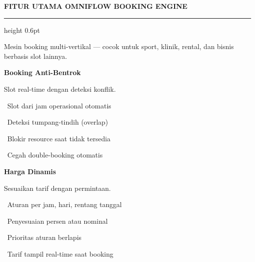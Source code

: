 \documentclass[a4paper]{article}
\newcommand{\sectiontitle}[1]{%
    \vspace{10pt}%
    {\fontsize{13}{16}\selectfont\bfseries\color{BlueDark} #1}\par\vspace{3pt}%
    {\color{BluePrimary}\hrule height 0.6pt}\par\vspace{8pt}%
}
\begin{document}
\sectiontitle{FITUR UTAMA OMNIFLOW BOOKING ENGINE}

{\fontsize{9.5}{13}\selectfont\color{TextLight} Mesin booking multi-vertikal --- cocok untuk sport, klinik, rental, dan bisnis berbasis slot lainnya.}

\vspace{6pt}

\noindent
\begin{minipage}[t]{0.485\textwidth}
    \colorbox{BluePrimary}{%
        \begin{minipage}{\dimexpr\textwidth-2\fboxsep\relax}
            {\fontsize{10}{13}\selectfont\bfseries\color{White} Booking Anti-Bentrok}
        \end{minipage}}\par
    \vspace{4pt}
    {\fontsize{9}{12}\selectfont\color{TextDark}%
    Slot real-time dengan deteksi konflik.\par\vspace{3pt}
    \textbullet\ Slot dari jam operasional otomatis\par\vspace{2pt}%
    \textbullet\ Deteksi tumpang-tindih (overlap)\par\vspace{2pt}%
    \textbullet\ Blokir resource saat tidak tersedia\par\vspace{2pt}%
    \textbullet\ Cegah double-booking otomatis}%

\end{minipage}%
\hfill
\begin{minipage}[t]{0.485\textwidth}
    \colorbox{EmeraldPrimary}{%
        \begin{minipage}{\dimexpr\textwidth-2\fboxsep\relax}
            {\fontsize{10}{13}\selectfont\bfseries\color{White} Harga Dinamis}
        \end{minipage}}\par
    \vspace{4pt}
    {\fontsize{9}{12}\selectfont\color{TextDark}%
    Sesuaikan tarif dengan permintaan.\par\vspace{3pt}
    \textbullet\ Aturan per jam, hari, rentang tanggal\par\vspace{2pt}%
    \textbullet\ Penyesuaian persen atau nominal\par\vspace{2pt}%
    \textbullet\ Prioritas aturan berlapis\par\vspace{2pt}%
    \textbullet\ Tarif tampil real-time saat booking}%

\end{minipage}
\end{document}
